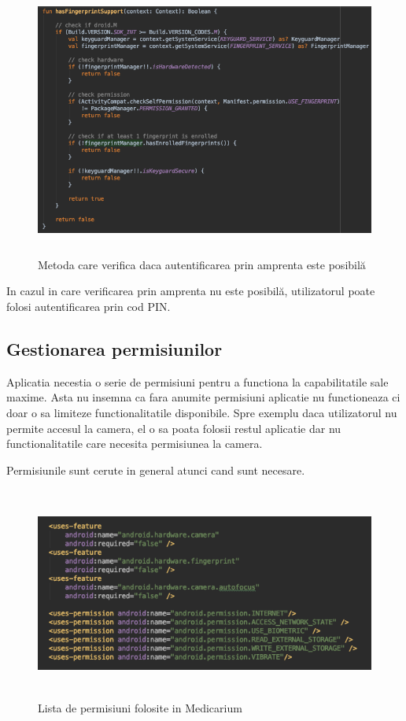 \documentclass[12pt]{article}
\begin{document}
\begin{figure}[H]
\centering
\includegraphics[width=14cm, height=9cm]{fingver.png}
\caption{Metoda care verifica daca autentificarea prin amprenta este posibilă}
\end{figure}

In cazul in care verificarea prin amprenta nu este posibilă, utilizatorul poate folosi
autentificarea prin cod PIN.

\newpage
\subsection{Gestionarea permisiunilor}

Aplicatia necestia o serie de permisiuni pentru a functiona la capabilitatile sale
maxime. Asta nu insemna ca fara anumite permisiuni aplicatie nu functioneaza ci doar o
sa limiteze functionalitatile disponibile. Spre exemplu daca utilizatorul nu permite
accesul la camera, el o sa poata folosii restul aplicatie dar nu functionalitatile care necesita 
permisiunea la camera.

Permisiunile sunt cerute in general atunci cand sunt necesare.

\begin{figure}[H]
    \centering
    \includegraphics[width=14cm, height=7cm]{listapermi.png}
    \caption{Lista de permisiuni folosite in Medicarium}
    \end{figure}
\end{document}
